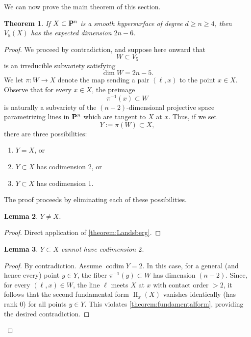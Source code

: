 \documentclass[12pt,reqno]{amsart}
\theoremstyle{plain}
\newtheorem{theorem}{Theorem}[section]
\newtheorem{lemma}[theorem]{Lemma}
\theoremstyle{remark}
\numberwithin{equation}{section}
\DeclareMathOperator{\II}{II}
\renewcommand{\to}{{\longrightarrow}}
\renewcommand {\P}{{\bf P}}
\providecommand{\codim}{\operatorname{codim}}
\numberwithin{equation}{section}
\begin{document}
We can now prove the main theorem of this section.

\begin{theorem}
  \label{theorem:generalV5} If $X \subset \P^{n}$ is a smooth
  hypersurface of degree $d \geq n \geq 4$, then $V_5(X)$ has the expected
  dimension $2n-6$.
\end{theorem}

\begin{proof}
  We proceed by contradiction, and suppose here onward that
\[W \subset V_{5}\] is an irreducible subvariety satisfying
\[\dim W = 2n-5.\]
We let $\pi: W \to X$ denote the map sending a pair $(\ell,x)$ to the
point $x \in X$.  Observe that for every $x \in X$, the preimage
\[\pi^{-1}(x) \subset W\] is naturally a subvariety of the $(n-2)$-dimensional projective space
parametrizing lines in $\P^{n}$ which are tangent to $X$ at $x$.
Thus, if we set
\[Y := \pi(W) \subset X,\] there are three possibilities:
\begin{enumerate}
\item  $Y = X$, or
\item  $Y \subset X$ has codimension $2$, or
\item $Y \subset X$ has codimension $1$.
\end{enumerate}


The proof proceeds by eliminating each of these possibilities.

\begin{lemma}
  \label{lemma:YneqX} $Y \neq X$.
\end{lemma}

\begin{proof}
  Direct application of \autoref{theorem:Landsberg}.
\end{proof}

\begin{lemma}
  \label{lemma:Ycodim2} $Y \subset X$ cannot have codimension $2$.
\end{lemma}

\begin{proof}
  By contradiction. Assume $\codim Y = 2$. In this case, for a general
  (and hence every) point $y \in Y$, the fiber $\pi^{-1}(y) \subset W$
  has dimension $(n-2)$.  Since, for every $(\ell,x) \in W$, the line
  $\ell$ meets $X$ at $x$ with contact order $>2$, it follows that the
  second fundamental form $\II_{x}(X)$ vanishes identically (has rank
  $0$) for all points $y \in Y$. This violates
  \autoref{theorem:fundamentalform}, providing the desired
  contradiction.
\end{proof}


\end{proof}
\end{document}

